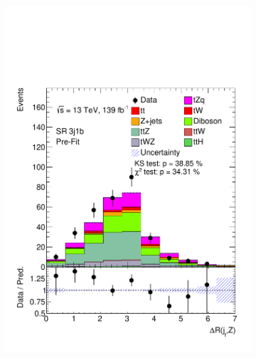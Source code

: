 \begin{figure}[!h]
\begin{subfigure}[b]{0.33\linewidth}
    \includegraphics[width=\linewidth]{ubonn-thesis/Chapters/Chapters_06/Figure/Input_distribution/SR_3j1b_dRjfZ.pdf} 
  \end{subfigure}%
  \begin{subfigure}[b]{0.33\linewidth}
    \centering

\end{subfigure}
\end{figure}
